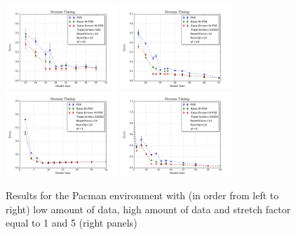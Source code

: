 \documentclass[letterpaper]{article}
\begin{document}
\begin{figure}[ht!]
%
\includegraphics[width=42mm]{Pacman500.png}
%
%
\includegraphics[width=42mm]{Pacman10k.png}
%
%
%
\includegraphics[width=42mm]{PacmanSF-1.png}
%
\includegraphics[width=42mm]{PacmanSF-5.png}\vspace*{-4mm}
\caption{Results for the Pacman environment with (in order from left to right) low amount of data, high amount of data and stretch factor equal to 1 and 5 (right panels)\label{fig-pacsf5}\vspace*{-4mm}}
\end{figure}
\end{document}
